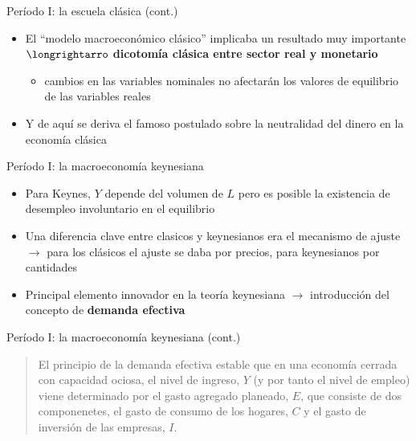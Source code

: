 \documentclass[
  ignorenonframetext,
]{beamer}
\providecommand{\tightlist}{%
  \setlength{\itemsep}{0pt}\setlength{\parskip}{0pt}}\usepackage{longtable,booktabs,array}
\begin{document}
\begin{frame}{Período I: la escuela clásica (cont.)}
\protect\hypertarget{peruxedodo-i-la-escuela-cluxe1sica-cont.-4}{}
\begin{itemize}
\tightlist
\item
  El ``modelo macroeconómico clásico'' implicaba un resultado muy
  importante \(\longrightarro\) \textbf{dicotomía clásica entre sector
  real y monetario}

  \begin{itemize}
  \tightlist
  \item
    cambios en las variables nominales no afectarán los valores de
    equilibrio de las variables reales
  \end{itemize}
\item
  Y de aquí se deriva el famoso postulado sobre la neutralidad del
  dinero en la economía clásica
\end{itemize}
\end{frame}

\begin{frame}{Período I: la macroeconomía keynesiana}
\protect\hypertarget{peruxedodo-i-la-macroeconomuxeda-keynesiana}{}
\begin{itemize}
\tightlist
\item
  Para Keynes, \(Y\) depende del volumen de \(L\) pero es posible la
  existencia de desempleo involuntario en el equilibrio
\item
  Una diferencia clave entre clasicos y keynesianos era el mecanismo de
  ajuste \(\longrightarrow\) para los clásicos el ajuste se daba por
  precios, para keynesianos por cantidades
\item
  Principal elemento innovador en la teoría keynesiana
  \(\longrightarrow\) introducción del concepto de \textbf{demanda
  efectiva}
\end{itemize}
\end{frame}

\begin{frame}{Período I: la macroeconomía keynesiana (cont.)}
\protect\hypertarget{peruxedodo-i-la-macroeconomuxeda-keynesiana-cont.}{}
\begin{quote}
El principio de la demanda efectiva estable que en una economía cerrada
con capacidad ociosa, el nivel de ingreso, \(Y\) (y por tanto el nivel
de empleo) viene determinado por el gasto agregado planeado, \(E\), que
consiste de dos componenetes, el gasto de consumo de los hogares, \(C\)
y el gasto de inversión de las empresas, \(I\).
\end{quote}
\end{frame}
\end{document}
